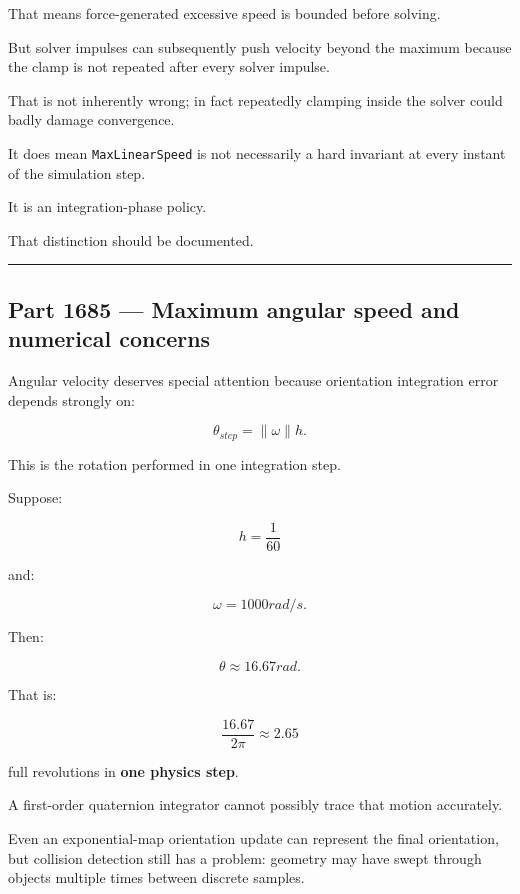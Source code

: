That means force-generated excessive speed is bounded before solving.

But solver impulses can subsequently push velocity beyond the maximum because the clamp is not repeated after every solver impulse.

That is not inherently wrong; in fact repeatedly clamping inside the solver could badly damage convergence.

It does mean \texttt{MaxLinearSpeed} is not necessarily a hard invariant at every instant of the simulation step.

It is an integration-phase policy.

That distinction should be documented.

\begin{center}\rule{0.5\linewidth}{0.5pt}\end{center}

\subsection{Part 1685 --- Maximum angular speed and numerical concerns}\label{06-engine-ii-ch038-part-1685-maximum-angular-speed-and-numerical-concerns}

\hypertarget{06-engine-ii-ch038-part-1685-maximum-angular-speed-and-numerical-concerns}{}

Angular velocity deserves special attention because orientation integration error depends strongly on:

\[
\boxed{
\theta_{step}
=
\|\omega\|h.
}
\]

This is the rotation performed in one integration step.

Suppose:

\[
h=\frac1{60}
\]

and:

\[
\omega=1000rad/s.
\]

Then:

\[
\theta
\approx16.67rad.
\]

That is:

\[
\frac{16.67}{2\pi}
\approx2.65
\]

full revolutions in \textbf{one physics step}.

A first-order quaternion integrator cannot possibly trace that motion accurately.

Even an exponential-map orientation update can represent the final orientation, but collision detection still has a problem: geometry may have swept through objects multiple times between discrete samples.

